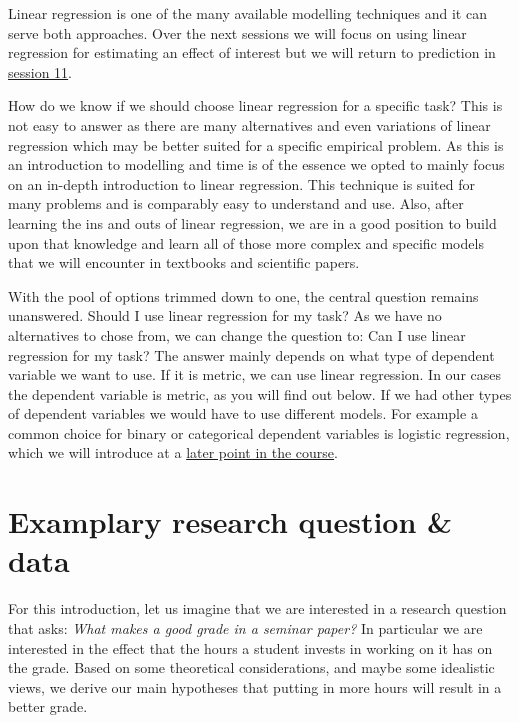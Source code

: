 \documentclass[
]{book}
\begin{document}
Linear regression is one of the many available modelling techniques and it can
serve both approaches. Over the next sessions we will focus on using
linear regression for estimating an effect of interest but we will return to
prediction in \protect\hyperlink{pm-t}{session 11}.

How do we know if we should choose linear regression for a specific task?
This is not easy to answer as there are many alternatives and even variations of
linear regression which may be better suited for a specific empirical problem.
As this is an introduction to modelling and time is of the essence we opted to
mainly focus on an in-depth introduction to linear regression.
This technique is suited for many problems and
is comparably easy to understand and use. Also, after learning the ins and outs
of linear regression, we are in a good position to build upon that knowledge and
learn all of those more complex and specific models that we will encounter in
textbooks and scientific papers.

With the pool of options trimmed down to one, the central question remains unanswered.
Should I use linear regression for my task? As we have no alternatives to chose
from, we can change the question to: Can I use linear regression for my task?
The answer mainly depends on what type of dependent variable we want to use.
If it is metric, we can use linear regression.
In our cases the dependent variable is metric, as you will find out below.
If we had other types of dependent variables we would have to use different
models.
For example a common choice for binary or categorical dependent variables is
logistic regression, which we will introduce at a \protect\hyperlink{log-est}{later point in the course}.

\hypertarget{examplary-research-question-data}{%
\section{Examplary research question \& data}\label{examplary-research-question-data}}

For this introduction, let us imagine that we are interested in a research
question that asks: \emph{What makes a good grade in a seminar paper?} In particular we
are interested in the effect that the hours a student invests in working on it
has on the grade. Based on some theoretical considerations, and maybe some
idealistic views, we derive our main hypotheses that putting in more hours will
result in a better grade.
\end{document}
